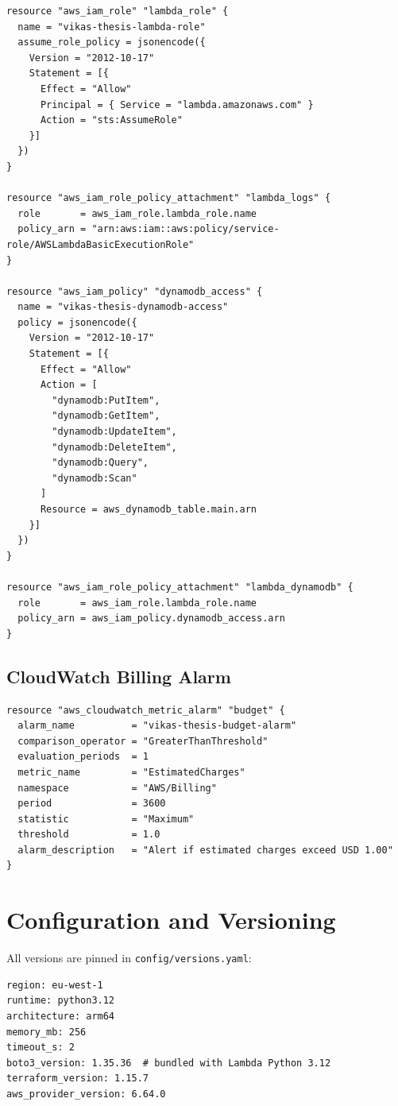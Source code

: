 \begin{verbatim}
resource "aws_iam_role" "lambda_role" {
  name = "vikas-thesis-lambda-role"
  assume_role_policy = jsonencode({
    Version = "2012-10-17"
    Statement = [{
      Effect = "Allow"
      Principal = { Service = "lambda.amazonaws.com" }
      Action = "sts:AssumeRole"
    }]
  })
}

resource "aws_iam_role_policy_attachment" "lambda_logs" {
  role       = aws_iam_role.lambda_role.name
  policy_arn = "arn:aws:iam::aws:policy/service-role/AWSLambdaBasicExecutionRole"
}

resource "aws_iam_policy" "dynamodb_access" {
  name = "vikas-thesis-dynamodb-access"
  policy = jsonencode({
    Version = "2012-10-17"
    Statement = [{
      Effect = "Allow"
      Action = [
        "dynamodb:PutItem",
        "dynamodb:GetItem",
        "dynamodb:UpdateItem",
        "dynamodb:DeleteItem",
        "dynamodb:Query",
        "dynamodb:Scan"
      ]
      Resource = aws_dynamodb_table.main.arn
    }]
  })
}

resource "aws_iam_role_policy_attachment" "lambda_dynamodb" {
  role       = aws_iam_role.lambda_role.name
  policy_arn = aws_iam_policy.dynamodb_access.arn
}
\end{verbatim}

\subsection{CloudWatch Billing Alarm}

\begin{verbatim}
resource "aws_cloudwatch_metric_alarm" "budget" {
  alarm_name          = "vikas-thesis-budget-alarm"
  comparison_operator = "GreaterThanThreshold"
  evaluation_periods  = 1
  metric_name         = "EstimatedCharges"
  namespace           = "AWS/Billing"
  period              = 3600
  statistic           = "Maximum"
  threshold           = 1.0
  alarm_description   = "Alert if estimated charges exceed USD 1.00"
}
\end{verbatim}

\section{Configuration and Versioning}

All versions are pinned in \texttt{config/versions.yaml}:

\begin{verbatim}
region: eu-west-1
runtime: python3.12
architecture: arm64
memory_mb: 256
timeout_s: 2
boto3_version: 1.35.36  # bundled with Lambda Python 3.12
terraform_version: 1.15.7
aws_provider_version: 6.64.0
\end{verbatim}

